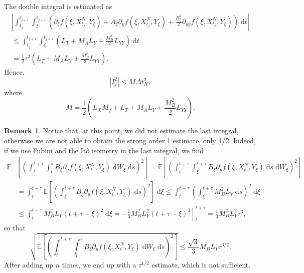 \documentclass[reqno,12pt]{amsart}
\theoremstyle{plain}%
\theoremstyle{definition}
\newtheorem{rmk}{Remark}[section]
\begin{document}
The double integral is estimated as
\begin{multline}
   \left|  \int_{t_j}^{t_{j+1}}  \int_\xi^{t_{j+1}} \left(\partial_\xi f(\xi, X_{t_j}^N, Y_\xi) + A_\xi \partial_y f(\xi, X_{t_j}^N, Y_\xi)  + \frac{B_\xi^2}{2}\partial_{yy}f(\xi, X_{t_j}^N, Y_\xi) \right) \;\mathrm{d}t \right| \\
   \leq \int_{t_j}^{t_{j+1}}  \int_\xi^{t_{j+1}} \left(L_T + M_A L_Y  + \frac{M_B^2}{2}L_{YY} \right) \;\mathrm{d}t \\
   = \frac{1}{2}\tau^2\left(L_T + M_A L_Y  + \frac{M_B^2}{2}L_{YY} \right).
\end{multline}
Hence,
\begin{equation}
\label{I2estimate}
\left| I_j^2 \right| \leq M\Delta t_N^2,
\end{equation}
where
$$
M = \frac{1}{2}\left(L_X M_f + L_T + M_A L_Y  + \frac{M_B^2}{2}L_{YY} \right).
$$

\begin{rmk}\tiny
Notice that, at this point, we did not estimate the last integral, otherwise we are not able to obtain the strong order 1 estimate, only 1/2. Indeed, if we use Fubini and the It\^o isometry in the last integral, we find
\begin{align*}
  \mathbb{E} & \left[ \left( \int_t^{t + \tau} \int_t^s B_\xi \partial_y f(\xi, X_t^N, Y_\xi)\;\mathrm{d}W_\xi\;\mathrm{d}s \right)^2\right] = \mathbb{E} \left[ \left( \int_t^{t + \tau} \int_\xi^{t+\tau} B_\xi \partial_y f(\xi, X_t^N, Y_\xi) \;\mathrm{d}s\;\mathrm{d}W_\xi \right)^2\right] \\
  & = \int_t^{t + \tau} \mathbb{E} \left[ \left( \int_\xi^{t+\tau} B_\xi \partial_y f(\xi, X_t^N, Y_\xi) \;\mathrm{d}s \right)^2\right] \;\mathrm{d}\xi  \leq  \int_t^{t + \tau}  \left( \int_\xi^{t+\tau} M_B^2 L_Y \;\mathrm{d}s \right)^2\;\mathrm{d}\xi \\
  & \leq  \int_t^{t + \tau}  M_B^2 L_Y (t + \tau - \xi)^2\;\mathrm{d}\xi  = \left. - \frac{1}{3} M_B^2 L_Y^2 (t + \tau - \xi)^3 \right]_t^{t+\tau}  = \frac{1}{3} M_B^2 L_Y^2 \tau^3,
\end{align*}
so that
\begin{equation}
\sqrt{\mathbb{E} \left[ \left( \int_t^{t + \tau} \int_t^s B_\xi \partial_y f(\xi, X_t^N, Y_\xi)\;\mathrm{d}W_\xi\;\mathrm{d}s \right)^2\right]} \leq \frac{\sqrt{3}}{3} M_B L_Y \tau^{3/2}.
\end{equation}
After adding up $n$ times, we end up with a $\tau^{1/2}$ estimate, which is not sufficient.
\end{rmk}
\end{document}
